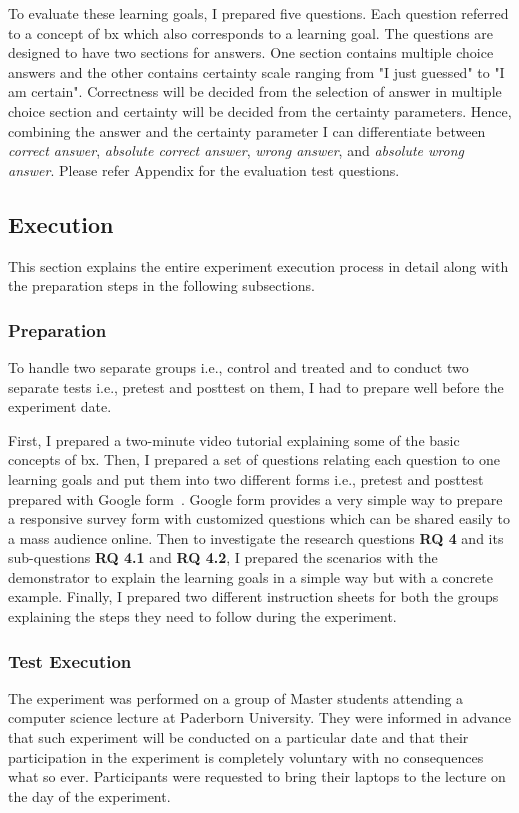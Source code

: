 To evaluate these learning goals, I prepared five questions. Each question referred to a concept of bx which also corresponds to a learning goal. The questions are designed to have two sections for answers. One section contains multiple choice answers and the other contains certainty scale ranging from "I just guessed" to "I am certain". Correctness will be decided from the selection of answer in multiple choice section and certainty will be decided from the certainty parameters. Hence, combining the answer and the certainty parameter I can differentiate between \emph{correct answer}, \emph{absolute correct answer}, \emph{wrong answer}, and \emph{absolute wrong answer}. Please refer Appendix for the evaluation test questions.

\subsection{Execution}\label{subsec:execution} 
This section explains the entire experiment execution process in detail along with the preparation steps in the following subsections.

\subsubsection{Preparation }\label{subsubsec:prep}
To handle two separate groups i.e., control and treated and to conduct two separate tests i.e., pretest and posttest on them, I had to prepare well before the experiment date. 

First, I prepared a two-minute video tutorial explaining some of the basic concepts of bx. Then, I prepared a set of questions relating each question to one learning goals and put them into two different forms i.e., pretest and posttest prepared with Google form~\cite{google-forms}. Google form provides a very simple way to prepare a responsive survey form with customized questions which can be shared easily to a mass audience online. Then to investigate the research questions \textbf{RQ 4} and its sub-questions \textbf{RQ 4.1} and \textbf{RQ 4.2}, I prepared the scenarios with the demonstrator to explain the learning goals in a simple way but with a concrete example. Finally, I prepared two different instruction sheets for both the groups explaining the steps they need to follow during the experiment.

\subsubsection{Test Execution}\label{subsubsec:execution}
The experiment was performed on a group of Master students attending a computer science lecture at Paderborn University. They were informed in advance that such experiment will be conducted on a particular date and that their participation in the experiment is completely voluntary with no consequences what so ever. Participants were requested to bring their laptops to the lecture on the day of the experiment.

